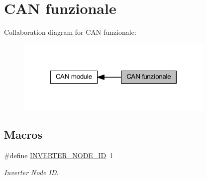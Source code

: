 \hypertarget{group___c_a_n__funzionale__group}{}\section{C\+AN funzionale}
\label{group___c_a_n__funzionale__group}
Collaboration diagram for C\+AN funzionale\+:\nopagebreak
\begin{figure}[H]
\begin{center}
\leavevmode
\includegraphics[width=270pt]{group___c_a_n__funzionale__group}
\end{center}
\end{figure}
\subsection*{Macros}
\begin{DoxyCompactItemize}
\item 
\mbox{\label{group___c_a_n__funzionale__group_ga59ea82aec4abe07072cbdad555a8c1b9}} 
\#define \mbox{\hyperlink{group___c_a_n__funzionale__group_ga59ea82aec4abe07072cbdad555a8c1b9}{I\+N\+V\+E\+R\+T\+E\+R\+\_\+\+N\+O\+D\+E\+\_\+\+ID}}~1
\begin{DoxyCompactList}\small\item\em Inverter Node ID. \end{DoxyCompactList}\end{DoxyCompactItemize}
